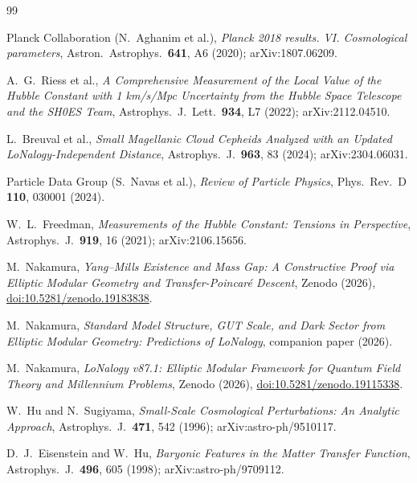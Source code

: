 \documentclass[12pt]{article}
\theoremstyle{plain}
\theoremstyle{definition}
\numberwithin{equation}{section}
\begin{document}
\begin{thebibliography}{99}

Planck Collaboration (N.~Aghanim et al.),
\textit{Planck 2018 results. VI. Cosmological parameters},
Astron.\ Astrophys.\ \textbf{641}, A6 (2020);
arXiv:1807.06209.

A.~G.~Riess et al.,
\textit{A Comprehensive Measurement of the Local Value of the Hubble Constant
with 1 km/s/Mpc Uncertainty from the Hubble Space Telescope and the SH0ES Team},
Astrophys.\ J.\ Lett.\ \textbf{934}, L7 (2022);
arXiv:2112.04510.

L.~Breuval et al.,
\textit{Small Magellanic Cloud Cepheids Analyzed with an Updated LoNalogy-Independent
Distance},
Astrophys.\ J.\ \textbf{963}, 83 (2024);
arXiv:2304.06031.

Particle Data Group (S.~Navas et al.),
\textit{Review of Particle Physics},
Phys.\ Rev.\ D \textbf{110}, 030001 (2024).

W.~L.~Freedman,
\textit{Measurements of the Hubble Constant: Tensions in Perspective},
Astrophys.\ J.\ \textbf{919}, 16 (2021);
arXiv:2106.15656.

M.~Nakamura,
\textit{Yang--Mills Existence and Mass Gap: A Constructive Proof via
Elliptic Modular Geometry and Transfer-Poincar\'e Descent},
Zenodo (2026), \href{https://doi.org/10.5281/zenodo.19183838}{doi:10.5281/zenodo.19183838}.

M.~Nakamura,
\textit{Standard Model Structure, GUT Scale, and Dark Sector from Elliptic
Modular Geometry: Predictions of LoNalogy},
companion paper (2026).

M.~Nakamura,
\textit{LoNalogy v87.1: Elliptic Modular Framework for Quantum Field Theory
and Millennium Problems},
Zenodo (2026), \href{https://doi.org/10.5281/zenodo.19115338}{doi:10.5281/zenodo.19115338}.

W.~Hu and N.~Sugiyama,
\textit{Small-Scale Cosmological Perturbations: An Analytic Approach},
Astrophys.\ J.\ \textbf{471}, 542 (1996);
arXiv:astro-ph/9510117.

D.~J.~Eisenstein and W.~Hu,
\textit{Baryonic Features in the Matter Transfer Function},
Astrophys.\ J.\ \textbf{496}, 605 (1998);
arXiv:astro-ph/9709112.

\end{thebibliography}
\end{document}
